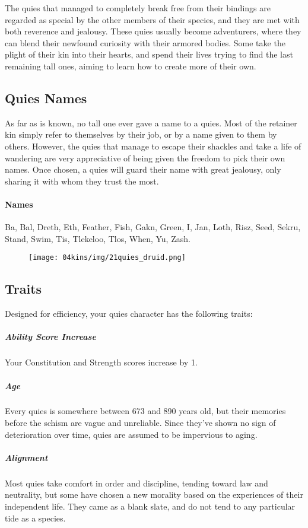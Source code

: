 The quies that managed to completely break free from their bindings are regarded as special by the other members of their species, and they are met with both reverence and jealousy.
These quies usually become adventurers, where they can blend their newfound curiosity with their armored bodies.
Some take the plight of their kin into their hearts, and spend their lives trying to find the last remaining tall ones, aiming to learn how to create more of their own.

\subsection*{Quies Names}
As far as is known, no tall one ever gave a name to a quies.
Most of the retainer kin simply refer to themselves by their job, or by a name given to them by others.
However, the quies that manage to escape their shackles and take a life of wandering are very appreciative of being given the freedom to pick their own names.
Once chosen, a quies will guard their name with great jealousy, only sharing it with whom they trust the most.

\paragraph{Names} Ba, Bal, Dreth, Eth, Feather, Fish, Gakn, Green, I, Jan, Loth, Risz, Seed, Sekru, Stand, Swim, Tis, Tlekeloo, Tlos, When, Yu, Zash.

\begin{figure}[!t]
    \centering
    \texttt{[image: 04kins/img/21quies\_druid.png]}
\end{figure}

\subsection*{Traits}
Designed for efficiency, your quies character has the following traits:

\subparagraph{Ability Score Increase} Your Constitution and Strength scores increase by 1.

\subparagraph{Age} Every quies is somewhere between 673 and 890 years old, but their memories before the schism are vague and unreliable.
Since they've shown no sign of deterioration over time, quies are assumed to be impervious to aging.

\subparagraph{Alignment} Most quies take comfort in order and discipline, tending toward law and neutrality, but some have chosen a new morality based on the experiences of their independent life.
They came as a blank slate, and do not tend to any particular tide as a species.

